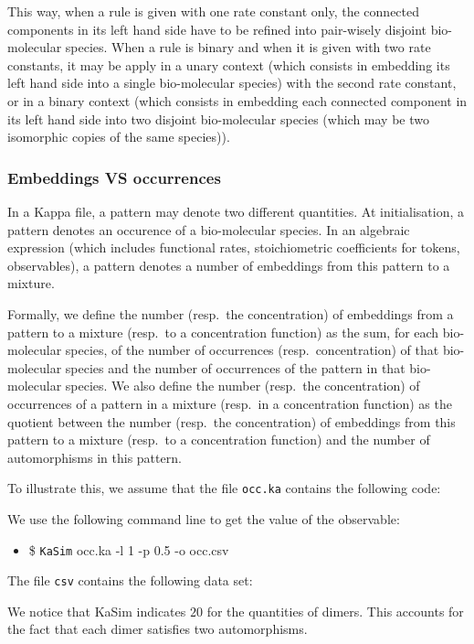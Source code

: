 \documentclass[11pt]{book}
\def\ttt#1{\texttt{#1}}
\def\ITE#1{\begin{itemize}#1\end{itemize}}
\begin{document}
  This way, when a rule is given with one rate constant only, the connected components in its left hand side have to be refined into pair-wisely disjoint bio-molecular species. When a rule is binary and when it is given with two rate constants,  it may be apply in a unary context (which consists in embedding its left hand side into a single bio-molecular species) with the second rate constant, or in a binary context (which consists in embedding each connected component in its left hand side into two disjoint bio-molecular species (which may be two isomorphic copies of the same species)).

  \subsubsection{Embeddings VS occurrences}

In a Kappa file, a pattern may denote two different quantities.
At initialisation, a pattern denotes an occurence of a bio-molecular species. In an algebraic expression (which includes functional rates,
stoichiometric coefficients for tokens, observables), a pattern denotes a number of embeddings from this pattern to a mixture.

Formally, we define the number (resp.~the concentration) of embeddings from a pattern to a mixture (resp.~to a concentration function) as
the sum, for each bio-molecular species,
 of the number of occurrences (resp.~concentration) of that bio-molecular species and the number of occurrences of the pattern in that bio-molecular species. We also define the number (resp.~the concentration) of occurrences of a pattern in a mixture (resp.~in a concentration function) as the quotient between the number (resp.~the concentration) of embeddings from this pattern to a mixture (resp.~to a concentration function) and the number of automorphisms in this pattern.

To illustrate this, we assume that the file \texttt{occ.ka} contains the following code:

We use the following command line to get the value of the observable:
\ITE{\item[\$] \ttt{KaSim} occ.ka -l 1 -p 0.5 -o occ.csv}

The file \texttt{csv} contains the following data set:
{\lstset{numbers=none}}
{\lstset{numbers=left}}

We notice that KaSim indicates $20$ for the quantities of dimers.
This accounts for the fact that each dimer satisfies two automorphisms.
\end{document}
